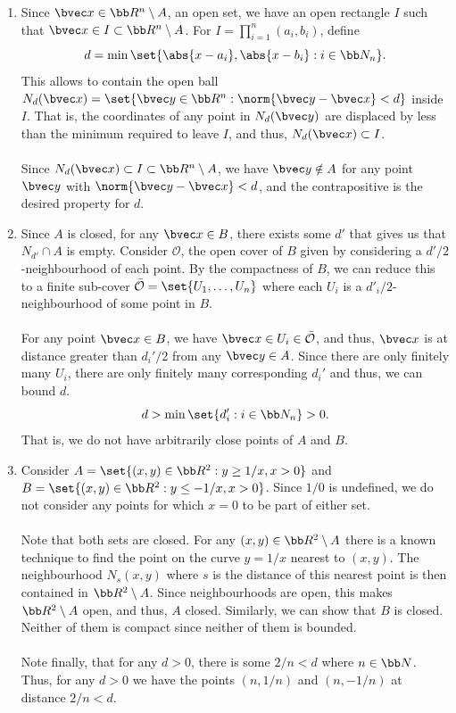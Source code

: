 \documentclass[12pt, letterpaper]{hmcpset}
\begin{document}
\begin{solution}
	\begin{enumerate}
		\item Since $\bvec x \in \bb R^n \setminus A$, an open set, we have an open rectangle $I$ such that $\bvec x \in I \subset \bb R^n \setminus A$. For $I = \prod_{i = 1}^n (a_i, b_i)$, define
			\[
				d = \min \set{\abs{x - a_i}, \abs{x - b_i} : i \in \bb N_n}.
			\]
			This allows to contain the open ball $N_d(\bvec x) = \set{\bvec y \in \bb R^n : \norm{\bvec y - \bvec x} < d}$ inside $I$. That is, the coordinates of any point in $N_d(\bvec y)$ are displaced by less than the minimum required to leave $I$, and thus, $N_d(\bvec x) \subset I$.\\\\
			Since $N_d(\bvec x) \subset I \subset \bb R^n \setminus A$, we have $\bvec y \notin A$ for any point $\bvec y$ with $\norm{\bvec y - \bvec x} < d$, and the contrapositive is the desired property for $d$.
		\item Since $A$ is closed, for any $\bvec x \in B$, there exists some $d'$ that gives us that $N_{d'} \cap A$ is empty. Consider $\mathcal O$, the open cover of $B$ given by considering a $d'/2$-neighbourhood of each point. By the compactness of $B$, we can reduce this to a finite sub-cover $\bar{\mathcal O} = \set{U_1, \ldots, U_n}$ where each $U_i$ is a $d'_i/2$-neighbourhood of some point in $B$.\\\\
			For any point $\bvec x \in B$, we have $\bvec x \in U_i \in \bar{\mathcal O}$, and thus, $\bvec x$ is at distance greater than $d_i'/2$ from any $\bvec y \in A$. Since there are only finitely many $U_i$, there are only finitely many corresponding $d_i'$ and thus, we can bound $d$.
			\[
				d > \min \set{d_i' : i \in \bb N_n} > 0.
			\]
			That is, we do not have arbitrarily close points of $A$ and $B$.
		\item Consider $A = \set{(x, y) \in \bb R^2 : y \ge 1/x, x > 0}$ and $B = \set{(x, y) \in \bb R^2 : y \le - 1/x, x > 0}$. Since $1/0$ is undefined, we do not consider any points for which $x = 0$ to be part of either set. \\\\
			Note that both sets are closed. For any $(x, y) \in \bb R^2 \setminus A$ there is a known technique to find the point on the curve $y = 1/x$ nearest to $(x, y)$. The neighbourhood $N_s(x, y)$ where $s$ is the distance of this nearest point is then contained in $\bb R^2 \setminus A$. Since neighbourhoods are open, this makes $\bb R^2 \setminus A$ open, and thus, $A$ closed. Similarly, we can show that $B$ is closed. Neither of them is compact since neither of them is bounded. \\\\
			Note finally, that for any $d > 0$, there is some $2/n < d$ where $n \in \bb N$. Thus, for any $d > 0$ we have the points $(n, 1/n)$ and $(n, -1/n)$ at distance $2/n < d$.
	\end{enumerate}
\end{solution}
\end{document}
